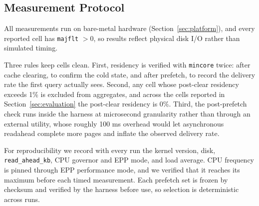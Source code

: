 \documentclass[sigconf, nonacm]{acmart}
\begin{document}

\subsection{Measurement Protocol}\label{sec:protocol}

All measurements run on bare-metal hardware (Section~\ref{sec:platform}), and every reported cell has \texttt{majflt} $>0$, so results reflect physical disk I/O rather than simulated timing. %

Three rules keep cells clean. First, residency is verified with \texttt{mincore} twice: after cache clearing, to confirm the cold state, and after prefetch, to record the delivery rate the first query actually sees. Second, any cell whose post-clear residency exceeds 1\% is excluded from aggregates, and across the cells reported in Section~\ref{sec:evaluation} the post-clear residency is 0\%. Third, the post-prefetch check runs inside the harness at microsecond granularity rather than through an external utility, whose roughly 100 ms overhead would let asynchronous readahead complete more pages and inflate the observed delivery rate.

For reproducibility we record with every run the kernel version, disk, \texttt{read\_ahead\_kb}, CPU governor and EPP mode, and load average. CPU frequency is pinned through EPP performance mode, and we verified that it reaches its maximum before each timed measurement. Each prefetch set is frozen by checksum and verified by the harness before use, so selection is deterministic across runs.
\end{document}
